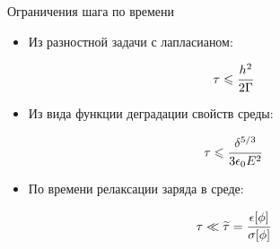 \begin{frame}{Ограничения шага по времени}
\begin{itemize}
	\item Из разностной задачи с лапласианом:
\end{itemize}
\vspace{-5mm}
\begin{center}\begin{minipage}{0.4\textwidth}\begin{alertblock}{}
\[
	\tau \leqslant \cfrac{h^2}{2 \Gamma}
\]
\vspace{-3mm}
\end{alertblock}\end{minipage}\end{center}
\begin{itemize}
	\item Из вида функции деградации свойств среды:
\end{itemize}
\vspace{-5mm}
\begin{center}\begin{minipage}{0.4\textwidth}\begin{block}{}
\[
	\tau \leqslant \cfrac{\delta^{5/3}}{3 \epsilon_0 E^2}
\]
\vspace{-3mm}
\end{block}\end{minipage}\end{center}
\begin{itemize}
	\item По времени релаксации заряда в среде:
\end{itemize}
\vspace{-5mm}
\begin{center}\begin{minipage}{0.4\textwidth}\begin{alertblock}{}
\[
	\tau \ll \widetilde{\tau} = \cfrac{\epsilon[\phi]}{\sigma[\phi]}
\]
\vspace{-3mm}
\end{alertblock}\end{minipage}\end{center}
\end{frame}